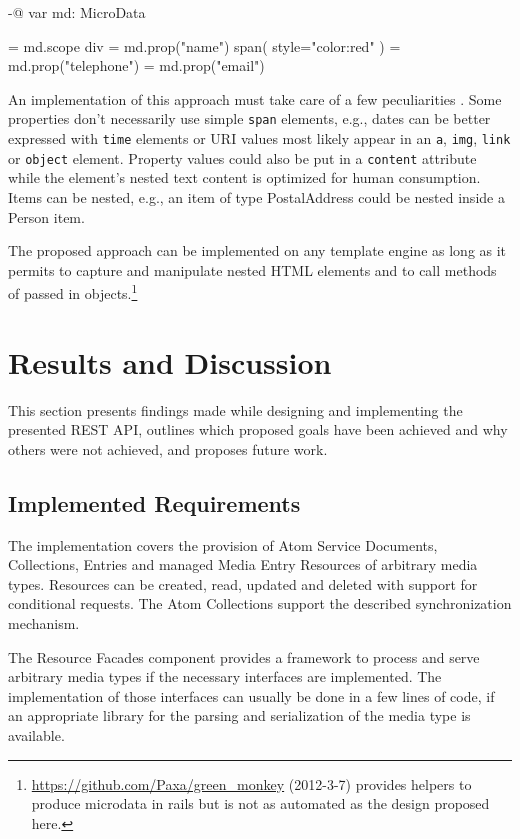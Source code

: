 \documentclass[11pt,a4paper,headsepline,twoside]{scrartcl}		%
\newcommand{\citeurl}[2]{\url{#1} (#2)}
\begin{document}
\begin{anylisting}[label=fig:microdata-template,
                   caption={Using a Microdata-aware data structure in a template}]
-@ var md: MicroData

= md.scope
  div
    = md.prop("name")
      span( style="color:red" )
    = md.prop("telephone")
    = md.prop("email")
\end{anylisting}

An implementation of this approach must take care of a few
peculiarities \cite{Hickson2011}. Some properties don't necessarily use simple
\lstinline:span: elements, e.g., dates can be better expressed with
\lstinline:time: elements or URI values most likely appear in an
\lstinline:a:, \lstinline:img:, \lstinline:link: or \lstinline:object:
element. Property values could also be put in a \lstinline:content: attribute
while the element's nested text content is optimized for human
consumption. Items can be nested, e.g., an item of type PostalAddress could be
nested inside a Person item.

The proposed approach can be implemented on any template engine as long as it
permits to capture and manipulate nested HTML elements and to call methods of
passed in
objects.\footnote{\citeurl{https://github.com/Paxa/green_monkey}{2012-3-7}
  provides helpers to produce microdata in rails but is not as automated as the
  design proposed here.}

\section{Results and Discussion}
\label{sec:results-discussion}

This section presents findings made while designing and implementing the
presented REST API, outlines which proposed goals have been achieved and why
others were not achieved, and proposes future work.

\subsection{Implemented Requirements}
\label{sec:impl-requ}

The implementation covers the provision of Atom Service Documents, Collections,
Entries and managed Media Entry Resources of arbitrary media types. Resources can
be created, read, updated and deleted with support for conditional requests. The
Atom Collections support the described synchronization mechanism.

The Resource Facades component provides a framework to process and serve
arbitrary media types if the necessary interfaces are implemented. The
implementation of those interfaces can usually be done in a few lines of code,
if an appropriate library for the parsing and serialization of the media type is
available.
\end{document}
